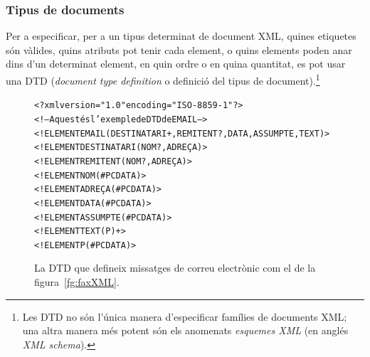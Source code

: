 \subsubsection{Tipus de documents}
Per a especificar, per a un tipus determinat de document XML, quines
etiquetes són vàlides, quins atributs pot tenir cada element, o quins
elements poden anar dins d'un determinat element, en quin ordre o en
quina quantitat, es pot usar una DTD (\emph{document type definition}
o definició del tipus de document).\footnote{Les DTD no són l'única
  manera d'especificar famílies de documents XML; una altra manera més
  potent són els anomenats \emph{esquemes XML} (en anglés \emph{XML
    schema}).}

\begin{figure}
\begin{center}
\begin{alltt}
<?xml version="1.0" encoding="ISO-8859-1"?>
<!-- Aquest és l'exemple de DTD de EMAIL -->
<!ELEMENT EMAIL (DESTINATARI+, REMITENT?, DATA, ASSUMPTE, TEXT)>
<!ELEMENT DESTINATARI (NOM?, ADREÇA)>
<!ELEMENT REMITENT (NOM?, ADREÇA)>
<!ELEMENT NOM (#PCDATA)>
<!ELEMENT ADREÇA (#PCDATA)>
<!ELEMENT DATA (#PCDATA)>
<!ELEMENT ASSUMPTE (#PCDATA)>
<!ELEMENT TEXT (P)+>
<!ELEMENT P (#PCDATA)>
\end{alltt}
\end{center}
\caption{La DTD que defineix missatges de correu electrònic com el de
  la figura~\ref{fg:faxXML}.}
\label{fg:faxDTD}
\end{figure}

